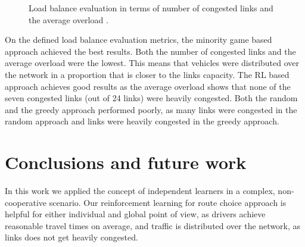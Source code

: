 \documentclass{RITA}
\begin{document}
\begin{figure}[ht]
  \centering
  \caption{Load balance evaluation in terms of number of congested links  and the average overload .}
  \label{fig:loadBalance}
\end{figure}

On the defined load balance evaluation metrics, the minority game based approach achieved the best results. Both the number of congested links and the average overload were the lowest. This means that vehicles were distributed over the network in a proportion that is closer to the links capacity. The RL based approach achieves good results as the average overload shows that none of the seven congested links (out of 24 links) were heavily congested. Both the random and the greedy approach performed poorly, as many links were congested in the random approach and links were heavily congested in the greedy approach.

\section{Conclusions and future work}
\label{sec:conclusions}

In this work we applied the concept of independent learners in a complex, non-cooperative scenario. Our reinforcement learning for route choice approach is helpful for either individual and global point of view, as drivers achieve reasonable travel times on average, and traffic is distributed over the network, as links does not get heavily congested.
\end{document}
